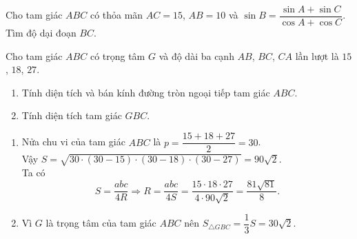 \begin{ex}%
Cho tam giác $ABC$ có thỏa mãn $AC=15$, $AB=10$ và $\sin B=\dfrac{\sin A+\sin C}{\cos A+\cos C}$. Tìm độ dại đoạn $BC$.

\end{ex}
\begin{ex}
	Cho tam giác $ABC$ có trọng tâm $G$ và độ dài ba cạnh $AB$, $BC$, $CA$ lần lượt là $15$, $18$, $27$.
	\begin{enumerate}
		\item Tính diện tích và bán kính đường tròn ngoại tiếp tam giác $ABC$.
		\item Tính diện tích tam giác $GBC$.
	\end{enumerate}
	\loigiai
	{
		\begin{enumerate}
			\item %
			 Nửa chu vi của tam giác $ABC$ là $p=\dfrac{15+18+27}{2}=30$.\\
			 Vậy $S=\sqrt{30\cdot (30-15)\cdot (30-18)\cdot (30-27)}=90\sqrt{2}$.\\
			 Ta có
			 $$S=\dfrac{abc}{4R}\Rightarrow R=\dfrac{abc}{4S}=\dfrac{15\cdot 18 \cdot 27}{4 \cdot 90\sqrt{2}}=\dfrac{81\sqrt{81}}{8}.$$
			\item %
			 Vì $G$ là trọng tâm của tam giác $ABC$ nên $S_{\triangle GBC}=\dfrac{1}{3}S=30\sqrt{2}$.
		\end{enumerate}
	}
\end{ex}

